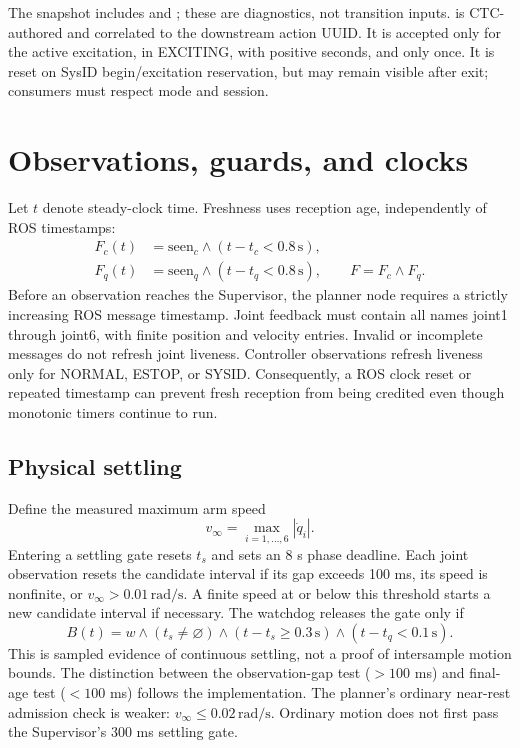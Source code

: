 \documentclass[11pt,a4paper]{report}
\newcommand{\id}[1]{\texttt{\small\detokenize{#1}}}
\begin{document}
The snapshot includes \id{last_error_code} and \id{detail}; these are diagnostics, not transition inputs. \id{excitation_start} is CTC-authored and correlated to the downstream action UUID. It is accepted only for the active excitation, in EXCITING, with positive seconds, and only once. It is reset on SysID begin/excitation reservation, but may remain visible after exit; consumers must respect mode and session.

\section{Observations, guards, and clocks}
Let $t$ denote steady-clock time. Freshness uses reception age, independently of ROS timestamps:
\begin{align}
 F_c(t)&=\mathrm{seen}_c\land(t-t_c<0.8\,\mathrm{s}),\\
 F_q(t)&=\mathrm{seen}_q\land(t-t_q<0.8\,\mathrm{s}),\qquad F=F_c\land F_q.
\end{align}
Before an observation reaches the Supervisor, the planner node requires a strictly increasing ROS message timestamp. Joint feedback must contain all names joint1 through joint6, with finite position and velocity entries. Invalid or incomplete messages do not refresh joint liveness. Controller observations refresh liveness only for NORMAL, ESTOP, or SYSID. Consequently, a ROS clock reset or repeated timestamp can prevent fresh reception from being credited even though monotonic timers continue to run.

\subsection{Physical settling}
Define the measured maximum arm speed
\begin{equation}
 v_\infty=\max_{i=1,\ldots,6}|\dot q_i|.
\end{equation}
Entering a settling gate resets $t_s$ and sets an 8 s phase deadline. Each joint observation resets the candidate interval if its gap exceeds 100 ms, its speed is nonfinite, or $v_\infty>0.01\,\mathrm{rad/s}$. A finite speed at or below this threshold starts a new candidate interval if necessary. The watchdog releases the gate only if
\begin{equation}
 B(t)= w\land(t_s\ne\varnothing)\land(t-t_s\ge0.3\,\mathrm{s})
          \land(t-t_q<0.1\,\mathrm{s}).
\end{equation}
This is sampled evidence of continuous settling, not a proof of intersample motion bounds. The distinction between the observation-gap test ($>100$ ms) and final-age test ($<100$ ms) follows the implementation. The planner's ordinary near-rest admission check is weaker: $v_\infty\le0.02\,\mathrm{rad/s}$. Ordinary motion does not first pass the Supervisor's 300 ms settling gate.
\end{document}
